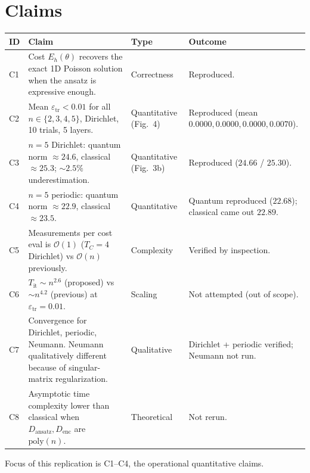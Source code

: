 \documentclass[11pt]{article}
\begin{document}
\section{Claims}
\begin{longtable}{@{}p{}p{}p{}p{}@{}}
\toprule
ID & Claim & Type & Outcome \\
\midrule
C1 & Cost $E_h(\theta)$ recovers the exact 1D Poisson solution when the ansatz is expressive enough. & Correctness & Reproduced. \\
C2 & Mean $\varepsilon_{\text{tr}}<0.01$ for all $n\in\{2,3,4,5\}$, Dirichlet, 10 trials, 5 layers. & Quantitative (Fig.~4) & Reproduced (mean $0.0000, 0.0000, 0.0000, 0.0070$). \\
C3 & $n=5$ Dirichlet: quantum norm $\approx 24.6$, classical $\approx 25.3$; $\sim\!2.5\%$ underestimation. & Quantitative (Fig.~3b) & Reproduced ($24.66$ / $25.30$). \\
C4 & $n=5$ periodic: quantum norm $\approx 22.9$, classical $\approx 23.5$. & Quantitative & Quantum reproduced ($22.68$); classical came out $22.89$. \\
C5 & Measurements per cost eval is $\mathcal{O}(1)$ ($T_C=4$ Dirichlet) vs $\mathcal{O}(n)$ previously. & Complexity & Verified by inspection. \\
C6 & $T_{\text{it}} \sim n^{2.6}$ (proposed) vs $\sim n^{4.2}$ (previous) at $\varepsilon_{\text{tr}}=0.01$. & Scaling & Not attempted (out of scope). \\
C7 & Convergence for Dirichlet, periodic, Neumann. Neumann qualitatively different because of singular-matrix regularization. & Qualitative & Dirichlet + periodic verified; Neumann not run. \\
C8 & Asymptotic time complexity lower than classical when $D_{\text{ansatz}}, D_{\text{enc}}$ are $\mathrm{poly}(n)$. & Theoretical & Not rerun. \\
\bottomrule
\end{longtable}

Focus of this replication is C1--C4, the operational quantitative claims.
\end{document}
